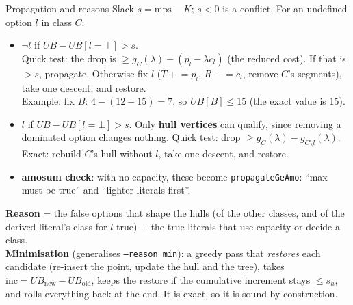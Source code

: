 \documentclass[aspectratio=169,11pt]{beamer}
\begin{document}
\begin{frame}{Propagation and reasons}
\footnotesize
Slack $s = \text{mps} - K$; $s < 0$ is a conflict. For an undefined option $l$ in class $C$:
\begin{itemize}\setlength\itemsep{2pt}
\item \textbf{$\neg l$} if $UB - UB[l{=}\top] > s$.\\
  Quick test: the drop is $\ge g_C(\lambda) - (p_l - \lambda c_l)$ (the reduced cost). If that is $> s$, propagate.
  Otherwise fix $l$ ($T \mathrel{+}= p_l$, $R \mathrel{-}= c_l$, remove $C$'s segments), take one descent, and restore.\\
  Example: fix $B$: $4 - (12 - 15) = 7$, so $UB[B] \le 15$ (the exact value is 15).
\item \textbf{$l$} if $UB - UB[l{=}\bot] > s$. Only \textbf{hull vertices} can qualify, since removing a dominated option changes nothing.
  Quick test: drop $\ge g_C(\lambda) - g_{C\setminus l}(\lambda)$. Exact: rebuild $C$'s hull without $l$, take one descent, and restore.
\item \textbf{amosum check}: with no capacity, these become \texttt{propagateGeAmo}: ``max must be true'' and ``lighter literals first''.
\end{itemize}
\vspace{1mm}
\textbf{Reason} = the false options that shape the hulls (of the other classes, and of the derived literal's class for
$l$ true) + the true literals that use capacity or decide a class.\\
\textbf{Minimisation} (generalises \texttt{--reason min}): a greedy pass that \emph{restores} each candidate (re-insert the
point, update the hull and the tree), takes $\text{inc} = UB_{\text{new}} - UB_{\text{old}}$, keeps the restore if the
cumulative increment stays $\le s_h$, and rolls everything back at the end. It is exact, so it is sound by construction.
\end{frame}
\end{document}

